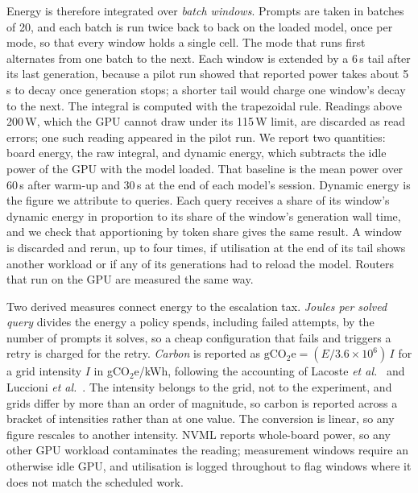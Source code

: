 Energy is therefore integrated over \emph{batch windows}. Prompts are taken
in batches of 20, and each batch is run twice back to back on the loaded
model, once per mode, so that every window holds a single cell. The mode
that runs first alternates from one batch to the next. Each window is
extended by a 6\,s tail after its last generation, because a pilot run
showed that reported power takes about 5\,s to decay once generation stops;
a shorter tail would charge one window's decay to the next. The integral is
computed with the trapezoidal rule. Readings above 200\,W, which the GPU
cannot draw under its 115\,W limit, are discarded as read errors; one such
reading appeared in the pilot run. We report two quantities: board energy,
the raw integral, and dynamic energy, which subtracts the idle power of the
GPU with the model loaded. That baseline is the mean power over 60\,s after
warm-up and 30\,s at the end of each model's session. Dynamic energy is the
figure we attribute to queries. Each query receives a share of its window's
dynamic energy in proportion to its share of the window's generation wall
time, and we check that apportioning by token share gives the same result.
A window is discarded and rerun, up to four times, if utilisation at the
end of its tail shows another workload or if any of its generations had to
reload the model. Routers that run on the GPU are measured the same way.

Two derived measures connect energy to the escalation tax. \emph{Joules per
solved query} divides the energy a policy spends, including failed attempts,
by the number of prompts it solves, so a cheap configuration that fails and
triggers a retry is charged for the retry. \emph{Carbon} is reported as
$\mathrm{gCO_2e} = (E / 3.6 \times 10^{6})\,I$ for a grid intensity $I$ in
gCO$_2$e/kWh, following the accounting of Lacoste \emph{et
al.}~\cite{lacoste2019quantifying} and Luccioni \emph{et
al.}~\cite{luccioni2024powerhungry}. The intensity belongs to the grid, not
to the experiment, and grids differ by more than an order of magnitude, so
carbon is reported across a bracket of intensities rather than at one value.
The conversion is linear, so any figure rescales to another intensity. NVML reports whole-board power, so any
other GPU workload contaminates the reading; measurement windows require an
otherwise idle GPU, and utilisation is logged throughout to flag windows where
it does not match the scheduled work.
